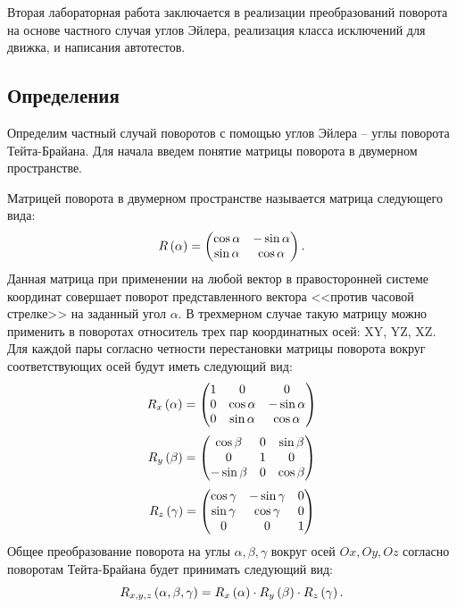 Вторая лабораторная работа заключается в реализации преобразований поворота на основе частного случая углов Эйлера, реализация класса исключений для движка, и написания автотестов. 


\subsection{Определения}

	Определим частный случай поворотов с помощью углов Эйлера -- углы поворота Тейта-Брайана. Для начала введем понятие матрицы поворота в двумерном пространстве.

	Матрицей поворота в двумерном пространстве называется матрица следующего вида:
	\[ R \left( \alpha \right) = \begin{pmatrix} \cos{\alpha} & -\sin{\alpha} \\ \sin{\alpha} & \cos{\alpha} \end{pmatrix}. \]
	Данная матрица при применении на любой вектор в правосторонней системе координат совершает поворот представленного вектора <<против часовой стрелке>> на заданный угол $\alpha$. В трехмерном случае такую матрицу можно применить в поворотах относитель трех пар координатных осей: XY, YZ, XZ. Для каждой пары согласно четности перестановки матрицы поворота вокруг соответствующих осей будут иметь следующий вид:
	\[ 
		R_x \left( \alpha \right) = 
		\begin{pmatrix} 
			1 & 0 & 0 \\ 
			0 & \cos{\alpha} & -\sin{\alpha} \\ 
			0 & \sin{\alpha} & \cos{\alpha} 
		\end{pmatrix}
	\] 
	\[
		R_y \left( \beta \right) = 
		\begin{pmatrix} 
			\cos{\beta} & 0 & \sin{\beta} \\ 
			0 & 1 & 0 \\ 
			-\sin{\beta} & 0 & \cos{\beta}
		\end{pmatrix} 
	\]
	\[ 
		R_z \left( \gamma \right) = 
		\begin{pmatrix} 
			\cos{\gamma} & -\sin{\gamma} & 0 \\ 
			\sin{\gamma} & \cos{\gamma} & 0 \\ 
			0 & 0 & 1
		\end{pmatrix}
	\]
	Общее преобразование поворота на углы $\alpha, \beta, \gamma$ вокруг осей $Ox, Oy, Oz$ согласно поворотам Тейта-Брайана будет принимать следующий вид:
	\[ R_{x, y, z} \left( \alpha, \beta, \gamma \right) = R_x \left( \alpha \right) \cdot R_y \left( \beta \right) \cdot R_z \left( \gamma \right). \]

